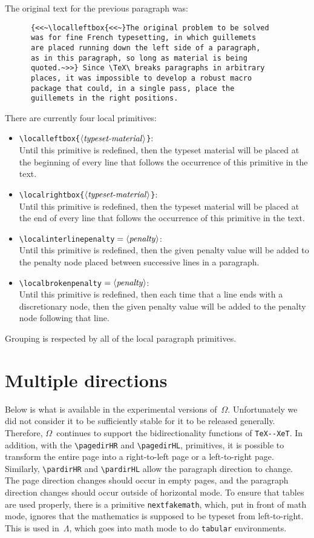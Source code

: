 \documentclass[fleqn]{article}
\newcommand{\OMEGA}{$\Omega$}
\newcommand{\LAMBDA}{$\Lambda$}
\newcommand{\showtext}{\langle\mbox{\emph{typeset-material}}\rangle}
\newcommand{\showpenalty}{\langle\mbox{\emph{penalty}}\rangle}
\begin{document}
The original text for the previous paragraph was:
\begin{verbatim}
      {<<~\localleftbox{<<~}The original problem to be solved
      was for fine French typesetting, in which guillemets
      are placed running down the left side of a paragraph,
      as in this paragraph, so long as material is being
      quoted.~>>} Since \TeX\ breaks paragraphs in arbitrary
      places, it was impossible to develop a robust macro
      package that could, in a single pass, place the
      guillemets in the right positions.
\end{verbatim}
There are currently four local primitives:
\begin{itemize}
\item \verb|\localleftbox{|$\showtext$\verb|}|:\\
Until this primitive is redefined, then the typeset material
will be placed at the beginning of every line that follows
the occurrence of this primitive in the text.
\item \verb|\localrightbox{|$\showtext$\verb|}|:\\
Until this primitive is redefined, then the typeset material
will be placed at the end of every line that follows
the occurrence of this primitive in the text.
\item \verb|\localinterlinepenalty|$\;=\showpenalty$:\\
Until this primitive is redefined, then the given penalty
value will be added to the penalty node placed between
successive lines in a paragraph.
\item \verb|\localbrokenpenalty|$\;=\showpenalty$:\\
Until this primitive is redefined, then each time that a
line ends with a discretionary node, then the given penalty
value will be added to the penalty node following that line.
\end{itemize}
Grouping is respected by all of the local paragraph primitives.

\section{Multiple directions}

Below is what is available in the experimental versions of~\OMEGA.
Unfortunately we did not consider it to be sufficiently stable
for it to be released generally.  Therefore, \OMEGA\ continues
to support the bidirectionality functions of \verb|TeX--XeT|.
In addition, with the \verb|\pagedirHR| and \verb|\pagedirHL|,
primitives, it is possible to transform the entire page into
a right-to-left page or a left-to-right page.  Similarly,
\verb|\pardirHR| and \verb|\pardirHL| allow the paragraph
direction to change.  The page direction changes should occur
in empty pages, and the paragraph direction changes should
occur outside of horizontal mode.  To ensure that tables
are used properly, there is a primitive \verb|nextfakemath|,
which, put in front of math mode, ignores that the mathematics
is supposed to be typeset from left-to-right.  This is used
in~\LAMBDA, which goes into math mode to do \verb|tabular|
environments.
\end{document}
